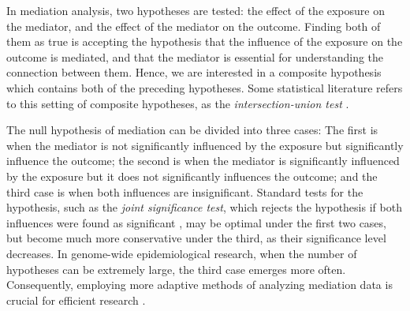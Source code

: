 \documentclass[ejs, twoside]{imsart}
\theoremstyle{plain}
\theoremstyle{remark}
\numberwithin{equation}{section}
\numberwithin{table}{section}
\numberwithin{figure}{section}
\begin{document}


In mediation analysis, two hypotheses are tested: the effect of the exposure on the mediator, and the effect of the mediator on the outcome. Finding both of them as true is accepting the hypothesis that the influence of the exposure on the outcome is mediated, and that the mediator is essential for understanding the connection between them. Hence, we are interested in a composite hypothesis which contains both of the preceding hypotheses. Some statistical literature refers to this setting of composite hypotheses, as the \emph{intersection-union test} \citep{berger_bioequivalence_1996, liu_uniformly_1995, berger_multiparameter_1982%
}.%

The null hypothesis of mediation can be divided into three cases: The first is when the mediator is not significantly influenced by the exposure but significantly influence the outcome;
the second is when the mediator is significantly influenced by the exposure but it does not significantly influences the outcome;
and the third case is when both influences are insignificant.
Standard tests for the hypothesis, such as the \emph{joint significance test}, which rejects the hypothesis if both influences were found as significant \citep{mackinnon_comparison_2002}, may be optimal under the first two cases, but become much more conservative under the third, as their significance level decreases. In genome-wide epidemiological research, %
when the number of hypotheses can be extremely large, the third case emerges more often. Consequently, employing more adaptive methods of analyzing mediation data is crucial for efficient research \citep{barfield_testing_2017}. 
\end{document}
